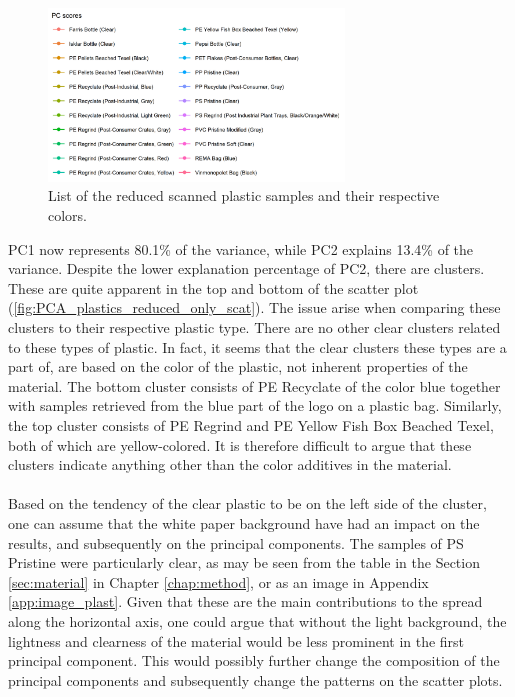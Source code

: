 \begin{figure}[H]
    \centering
    \includegraphics[width=0.7\textwidth]{Images/results/PCA_plastics_reduced_list.png}
    \caption{List of the reduced scanned plastic samples and their respective colors.}
    \label{fig:PCA_plastics_reduced_list}
\end{figure}
\noindent
PC1 now represents 80.1\% of the variance, while PC2 explains 13.4\% of the variance. Despite the lower explanation percentage of PC2, there are clusters. These are quite apparent in the top and bottom of the scatter plot (\ref{fig:PCA_plastics_reduced_only_scat}). The issue arise when comparing these clusters to their respective plastic type. There are no other clear clusters related to these types of plastic. In fact, it seems that the clear clusters these types are a part of, are based on the color of the plastic, not inherent properties of the material. The bottom cluster consists of PE Recyclate of the color blue together with samples retrieved from the blue part of the logo on a plastic bag. Similarly, the top cluster consists of PE Regrind and PE Yellow Fish Box Beached Texel, both of which are yellow-colored. It is therefore difficult to argue that these clusters indicate anything other than the color additives in the material.
\\\\
Based on the tendency of the clear plastic to be on the left side of the cluster, one can assume that the white paper background have had an impact on the results, and subsequently on the principal components. The samples of PS Pristine were particularly clear, as may be seen from the table in the Section \ref{sec:material} in Chapter \ref{chap:method}, or as an image in Appendix \ref{app:image_plast}. Given that these are the main contributions to the spread along the horizontal axis, one could argue that without the light background, the lightness and clearness of the material would be less prominent in the first principal component. This would possibly further change the composition of the principal components and subsequently change the patterns on the scatter plots. 
